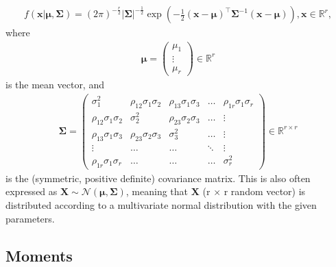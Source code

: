 \begin{definition}
    \begin{align}
        f(\bm{x}| \bm{\mu}, \bm{\Sigma})
        = (2\pi)^{-\frac{r}{2}}
        \left|\bm{\Sigma}\right|^{-\frac{1}{2}}
        \exp\left(-\frac{1}{2}(\bm{x}-\bm{\mu})^\top \bm{\Sigma}^{-1} (\bm{x}-\bm{\mu})\right),
        \bm{x} \in \mathbb{R}^r,
    \end{align}
    where
    \begin{align}
        \bm{\mu} =
        \begin{pmatrix}
            \mu_1  \\
            \vdots \\
            \mu_r
        \end{pmatrix}
        \in \mathbb{R}^r
    \end{align}
    is the mean vector, and
    \begin{align}
        \bm{\Sigma} =
        \begin{pmatrix}
            \sigma_1^2                & \rho_{12}\sigma_1\sigma_2 & \rho_{13}\sigma_1\sigma_3 & \ldots & \rho_{1r}\sigma_1\sigma_r \\
            \rho_{12}\sigma_1\sigma_2 & \sigma_2^2                & \rho_{23}\sigma_2\sigma_3 & \ldots & \vdots                    \\
            \rho_{13}\sigma_1\sigma_3 & \rho_{23}\sigma_2\sigma_3 & \sigma_3^2                & \ldots & \vdots                    \\
            \vdots                    & \ldots                    & \ldots                    & \ddots & \vdots                    \\
            \rho_{1r}\sigma_1\sigma_r & \ldots                    & \ldots                    & \ldots & \sigma_r^2
        \end{pmatrix}
        \in \mathbb{R}^{r\times r}
    \end{align}
    is the (symmetric, positive definite) covariance matrix.
    This is also often expressed as $\bm{X} \sim \mathcal{N}(\bm{\mu}, \bm{\Sigma})$,
    meaning that $\bm{X}$ (r $\times$ r random vector) is distributed
    according to a multivariate normal distribution with the given parameters.
\end{definition}

\subsection{Moments}\label{subsec:moments}

